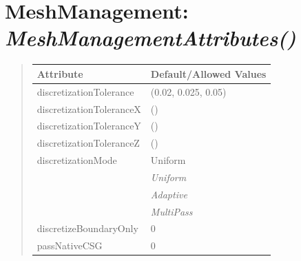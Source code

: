 \documentclass[letterpaper,10pt,english]{sphinxmanual}
\begin{document}
\begin{DUlineblock}{0em}
\item[] 
\end{DUlineblock}

\begin{DUlineblock}{0em}
\item[] 
\end{DUlineblock}


\section{\textbf{MeshManagement}: \emph{MeshManagementAttributes()}}
\label{attributes:meshmanagement-meshmanagementattributes}
\begin{DUlineblock}{0em}
\item[] 
\end{DUlineblock}
\begin{quote}

\begin{tabulary}{\linewidth}{|L|L|}
\hline

\textbf{Attribute}
 & 
\textbf{Default/Allowed Values}
\\
\hline
discretizationTolerance
 & 
(0.02, 0.025, 0.05)
\\
\hline
discretizationToleranceX
 & 
()
\\
\hline
discretizationToleranceY
 & 
()
\\
\hline
discretizationToleranceZ
 & 
()
\\
\hline
discretizationMode
 & 
Uniform
\\
\hline & 
\emph{Uniform}
\\
\hline & 
\emph{Adaptive}
\\
\hline & 
\emph{MultiPass}
\\
\hline
discretizeBoundaryOnly
 & 
0
\\
\hline
passNativeCSG
 & 
0
\\
\hline\end{tabulary}

\end{quote}

\begin{DUlineblock}{0em}
\item[] 
\end{DUlineblock}

\begin{DUlineblock}{0em}
\item[] 
\end{DUlineblock}
\end{document}
